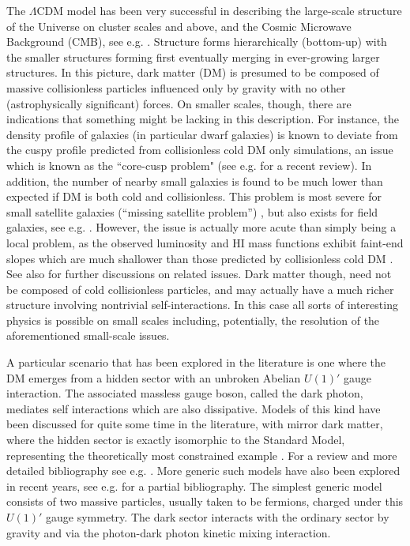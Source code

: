 \documentclass[12pt]{article}
\begin{document}
The $\Lambda$CDM model has been very successful in describing the large-scale structure of the Universe on
cluster scales and above, and the Cosmic Microwave Background (CMB), see e.g. \cite{planck,kei,wilkinson,tegmark,2dfgrs,blake,sdss,anderson,boss}. Structure forms hierarchically (bottom-up) 
with the smaller structures forming first 
eventually merging in ever-growing larger structures. In this picture, dark matter (DM) is presumed to be composed of massive collisionless particles
influenced only by gravity with no other (astrophysically significant) forces.
On smaller scales, though, there are indications that something might 
be lacking in this description. For instance, the density profile of galaxies (in particular dwarf galaxies) is known to deviate from the 
cuspy profile predicted from collisionless cold DM only simulations, an issue which is known as the ``core-cusp problem" 
(see e.g. \cite{deblok} for a recent review). In addition, the number of nearby small galaxies is found 
to be much lower than expected if DM is both cold and collisionless. This problem is most 
severe for small satellite galaxies (``missing satellite problem'') \cite{klypin,moore}, but also exists 
for field galaxies, see e.g. \cite{Zwaan,kly2,pap}. 
However, the issue is actually more acute than simply being a local problem, as the observed luminosity and HI mass 
functions exhibit faint-end slopes which are much shallower than those predicted by collisionless cold DM \cite{zavala}. See also \cite{b3,weinberg} for further discussions on related issues.
Dark matter though, 
need not be composed of cold collisionless particles, and may actually have a much richer structure involving 
nontrivial self-interactions. In this case all sorts of interesting physics is possible on small scales including, 
potentially, the resolution of the aforementioned small-scale issues.

A particular scenario that has been explored in the literature is one where the DM emerges from a hidden sector with an unbroken Abelian $U(1)'$ 
gauge interaction. The associated massless gauge boson, called the dark photon, mediates self  interactions which are also dissipative. 
Models of this kind have been discussed for quite some time in the literature, with mirror dark matter, where the hidden 
sector is exactly isomorphic to the Standard Model, representing the theoretically most constrained 
example \cite{blin,H1,flv,ber1,ignatiev,ber2,m0,sph,sil3,ciar9,cmb2,cmb3}. For a review and more detailed bibliography see e.g. \cite{m1}. 
More generic such models have also been explored in recent years, see 
e.g.  \cite{rich1,berezhiani1,and2,rich2,rich4,rich2x,and1,rich1x,rich5,cyr2,rich6,cyn,fischler1,rich7,sigurdson4,rich8,
petraki2,raidal,reece} for a partial bibliography. The simplest generic model consists of two massive particles, 
usually taken to be fermions, charged under this $U(1)'$ gauge symmetry. The dark sector 
interacts with the ordinary sector by gravity and via the photon-dark photon kinetic mixing interaction.
\end{document}
